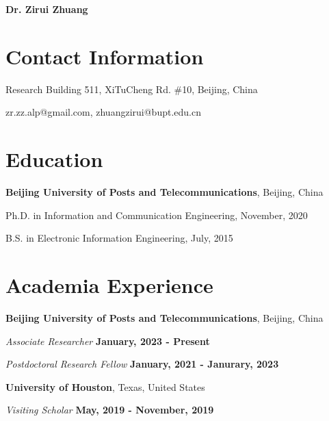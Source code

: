 \documentclass[letterpaper,11pt]{article}
\newcommand{\name}{Dr. Zirui Zhuang} %
\newcommand{\contentlength}{5.25in} %
\begin{document}
	\selectfont
	
	\textbf{\name}
	\section{\textbf{Contact Information}}
	\begin{tcolorbox}[flush right,breakable,colback=white,colframe=white,width=\contentlength]
		\parbox{3in}{
			Research Building 511, XiTuCheng Rd. \#10, Beijing, China
		}
		\hfill
		\parbox{2in}{
			zr.zz.alp@gmail.com, zhuangzirui@bupt.edu.cn
		}
	\end{tcolorbox}
		
	
	
	\section{\textbf{Education}}
	\begin{tcolorbox}[flush right,breakable,colback=white,colframe=white,width=\contentlength]
		\textbf{Beijing University of Posts and Telecommunications}, Beijing, China
		
		\quad Ph.D. in Information and Communication Engineering, November, 2020
		
		\quad B.S. in Electronic Information Engineering, July, 2015
	\end{tcolorbox}
	
	
	
	
	\section{\textbf{Academia Experience}}
	\begin{tcolorbox}[flush right,breakable,colback=white,colframe=white,width=\contentlength]
		\textbf{Beijing University of Posts and Telecommunications}, Beijing, China

		\quad \textit{Associate Researcher} \null\hfill \textbf{January, 2023 - Present}

		\quad \textit{Postdoctoral Research Fellow} \null\hfill \textbf{January, 2021 - Janurary, 2023}
		
		\textbf{University of Houston}, Texas, United States
		
		\quad \textit{Visiting Scholar} \null\hfill \textbf{May, 2019 - November, 2019}
	\end{tcolorbox}
	
\end{document}
